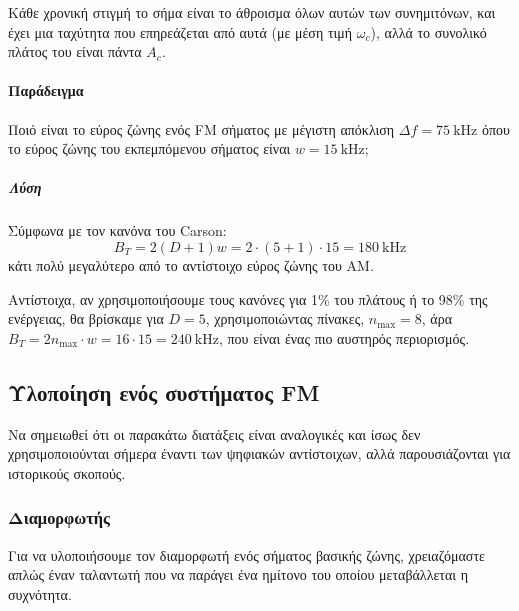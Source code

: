 \documentclass[11pt,a4paper,notitlepage,fleqn,final]{article}
\begin{document}

Κάθε χρονική στιγμή το σήμα είναι το άθροισμα όλων αυτών των συνημιτόνων, και έχει μια
ταχύτητα που επηρεάζεται από αυτά (με μέση τιμή \( \omega_c \)), αλλά το συνολικό πλάτος του
είναι πάντα \( A_c \).

\paragraph{Παράδειγμα}
Ποιό είναι το εύρος ζώνης ενός FM σήματος με μέγιστη απόκλιση \( Δf = \SI{75}{\kilo\hertz} \)
όπου το εύρος ζώνης του εκπεμπόμενου σήματος είναι \( w=\SI{15}{\kilo\hertz} \);

\subparagraph{Λύση}
Σύμφωνα με τον κανόνα του Carson:
\[
B_T = 2(D+1)w = 2\cdot(5+1)\cdot 15 = \SI{180}{\kilo\hertz}
\]
κάτι πολύ μεγαλύτερο από το αντίστοιχο εύρος ζώνης του AM.

Αντίστοιχα, αν χρησιμοποιήσουμε τους κανόνες για 1\% του πλάτους ή το 98\% της ενέργειας,
θα βρίσκαμε για \( D=5 \), χρησιμοποιώντας πίνακες, \( n_{\max} = 8 \), άρα
\( B_T = 2n_{\max} \cdot w = 16\cdot 15 = \SI{240}{\kilo\hertz} \), που είναι ένας πιο
αυστηρός περιορισμός.

\subsection{Υλοποίηση ενός συστήματος FM}
Να σημειωθεί ότι οι παρακάτω διατάξεις είναι αναλογικές και ίσως δεν χρησιμοποιούνται
σήμερα έναντι των ψηφιακών αντίστοιχων, αλλά παρουσιάζονται για ιστορικούς σκοπούς.

\subsubsection{Διαμορφωτής}
Για να υλοποιήσουμε τον διαμορφωτή ενός σήματος βασικής ζώνης,
χρειαζόμαστε απλώς έναν ταλαντωτή που να παράγει ένα ημίτονο του
οποίου μεταβάλλεται η συχνότητα.
\end{document}
